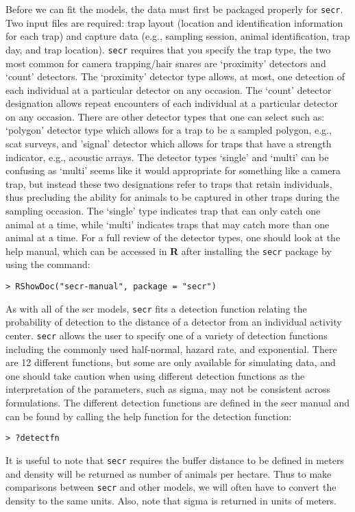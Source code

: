 Before we can fit the models, the data must first be packaged properly
for 
\mbox{\tt secr}.  Two input files are required: trap layout (location and
identification information for each trap) and capture data (e.g.,
sampling session, animal identification, trap day, and trap location).
\mbox{\tt secr} requires that you specify the trap type, the two most common for
camera trapping/hair snares are ‘proximity’ detectors and ‘count’
detectors.  The `proximity' detector type allows, at most, one
detection of each individual at a particular detector on any occasion.
The ‘count’ detector designation allows repeat encounters of each
individual at a particular detector on any occasion.  There are other
detector types that one can select such as: `polygon' detector type
which allows for a trap to be a sampled polygon, e.g., scat surveys,
and 'signal' detector which allows for traps that have a strength
indicator, e.g., acoustic arrays.  The detector types ‘single’ and
‘multi’ can be confusing as ‘multi’ seems like it would appropriate
for something like a camera trap, but instead these two designations
refer to traps that retain individuals, thus precluding the ability
for animals to be captured in other traps during the sampling
occasion.  The ‘single’ type indicates trap that can only catch one
animal at a time, while ‘multi’ indicates traps that may catch more
than one animal at a time.  For a full review of the detector types,
one should look at the help manual, which can be accessed in {\bf R} after
installing the \mbox{\tt secr} package by using the command:
\begin{verbatim}
> RShowDoc("secr-manual", package = "secr")
\end{verbatim}
As with all of the scr models, \mbox{\tt secr} fits a detection function relating
the probability of detection to the distance of a detector from an
individual activity center. \mbox{\tt secr} allows the user to specify one of a
variety of detection functions including the commonly used
half-normal, hazard rate, and exponential.  There are 12 different
functions, but some are only available for simulating data, and one
should take caution when using different detection functions as the
interpretation of the parameters, such as sigma, may not be consistent
across formulations.  The different detection functions are defined in
the secr manual and can be found by calling the help function for the
detection function:
\begin{verbatim}
> ?detectfn
\end{verbatim}
It is useful to note that \mbox{\tt secr} requires the buffer distance to be
defined in meters and density will be returned as number of animals
per hectare.  Thus to make comparisons between \mbox{\tt secr} and other models,
we will often have to convert the density to the same units.  Also,
note that sigma is returned in units of meters.

